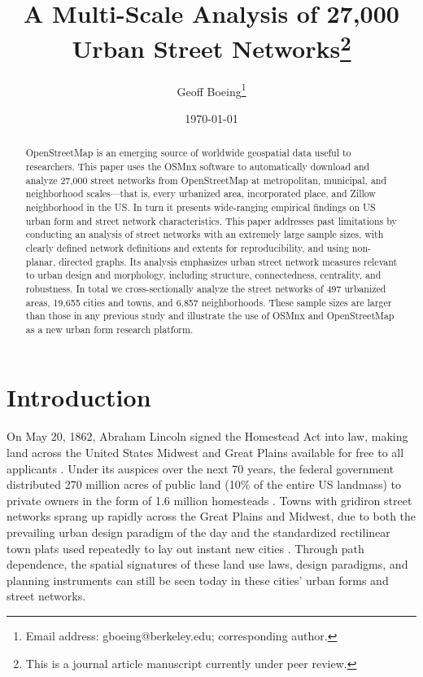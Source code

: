 \documentclass{article}
\begin{document}
\title{A Multi-Scale Analysis of 27,000 Urban Street Networks\footnote{This is a journal article manuscript currently under peer review.}}
\author{Geoff Boeing\footnote{Email address: gboeing@berkeley.edu; corresponding author.}}
\date{\today}
\maketitle



\begin{abstract}
	
OpenStreetMap is an emerging source of worldwide geospatial data useful to researchers. This paper uses the OSMnx software to automatically download and analyze 27,000 street networks from OpenStreetMap at metropolitan, municipal, and neighborhood scales---that is, every urbanized area, incorporated place, and Zillow neighborhood in the US. In turn it presents wide-ranging empirical findings on US urban form and street network characteristics. This paper addresses past limitations by conducting an analysis of street networks with an extremely large sample sizes, with clearly defined network definitions and extents for reproducibility, and using non-planar, directed graphs. Its analysis emphasizes urban street network measures relevant to urban design and morphology, including structure, connectedness, centrality, and robustness. In total we cross-sectionally analyze the street networks of 497 urbanized areas, 19,655 cities and towns, and 6,857 neighborhoods. These sample sizes are larger than those in any previous study and illustrate the use of OSMnx and OpenStreetMap as a new urban form research platform.

\end{abstract}



\section{Introduction}

On May 20, 1862, Abraham Lincoln signed the Homestead Act into law, making land across the United States Midwest and Great Plains available for free to all applicants \cite{porterfield_homestead_2005}. Under its auspices over the next 70 years, the federal government distributed 270 million acres of public land (10\% of the entire US landmass) to private owners in the form of 1.6 million homesteads \cite{lee_kansas_1979, sherraden_inclusion_2005}. Towns with gridiron street networks sprang up rapidly across the Great Plains and Midwest, due to both the prevailing urban design paradigm of the day and the standardized rectilinear town plats used repeatedly to lay out instant new cities \cite{southworth_streets_1997}. Through path dependence, the spatial signatures of these land use laws, design paradigms, and planning instruments can still be seen today in these cities' urban forms and street networks.
\end{document}
